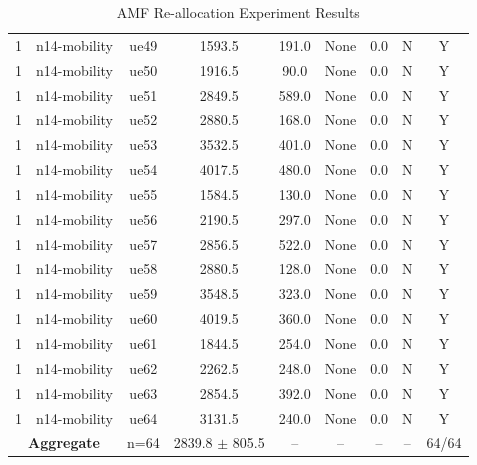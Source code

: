 \begin{table}[ht]
\begin{tabular}{|c|c|c|c|c|c|c|c|c|}
1 & n14-mobility & ue49 & 1593.5 & 191.0 & None & 0.0 & N & Y \\
1 & n14-mobility & ue50 & 1916.5 & 90.0 & None & 0.0 & N & Y \\
1 & n14-mobility & ue51 & 2849.5 & 589.0 & None & 0.0 & N & Y \\
1 & n14-mobility & ue52 & 2880.5 & 168.0 & None & 0.0 & N & Y \\
1 & n14-mobility & ue53 & 3532.5 & 401.0 & None & 0.0 & N & Y \\
1 & n14-mobility & ue54 & 4017.5 & 480.0 & None & 0.0 & N & Y \\
1 & n14-mobility & ue55 & 1584.5 & 130.0 & None & 0.0 & N & Y \\
1 & n14-mobility & ue56 & 2190.5 & 297.0 & None & 0.0 & N & Y \\
1 & n14-mobility & ue57 & 2856.5 & 522.0 & None & 0.0 & N & Y \\
1 & n14-mobility & ue58 & 2880.5 & 128.0 & None & 0.0 & N & Y \\
1 & n14-mobility & ue59 & 3548.5 & 323.0 & None & 0.0 & N & Y \\
1 & n14-mobility & ue60 & 4019.5 & 360.0 & None & 0.0 & N & Y \\
1 & n14-mobility & ue61 & 1844.5 & 254.0 & None & 0.0 & N & Y \\
1 & n14-mobility & ue62 & 2262.5 & 248.0 & None & 0.0 & N & Y \\
1 & n14-mobility & ue63 & 2854.5 & 392.0 & None & 0.0 & N & Y \\
1 & n14-mobility & ue64 & 3131.5 & 240.0 & None & 0.0 & N & Y \\
\multicolumn{2}{|c|}{\textbf{Aggregate}} & n=64 & 2839.8 $\pm$ 805.5 & -- & -- & -- & -- & 64/64 \\
\hline
\end{tabular}
\caption{AMF Re-allocation Experiment Results}
\label{tab:amf_realloc}
\end{table}
